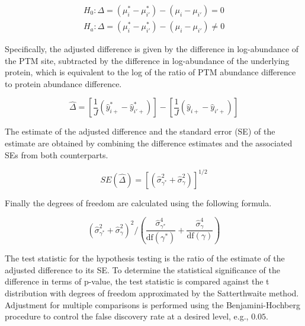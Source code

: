 \documentclass[mcp]{article}
\numberwithin{table}{section}
\begin{document}
\begin{equation}
\begin{aligned}
H_{0}: \Delta = ( \mu_{i}^{\ast} - \mu_{i'}^{\ast} ) - ( \mu_{i} - \mu_{i'} ) = 0 \\
H_{a}: \Delta = ( \mu_{i}^{\ast} - \mu_{i'}^{\ast} ) - ( \mu_{i} - \mu_{i'} ) \neq 0
\end{aligned}
\label{eq_1}
\end{equation}

Specifically, the adjusted difference is given by the difference in log-abundance of the PTM site, subtracted by the difference in log-abundance of the underlying protein, which is equivalent to the log of the ratio of PTM abundance difference to protein abundance difference. 

\begin{equation}
\hat{\Delta} = \left[ \frac{1}{J} \left( \hat{y}_{i+}^{\ast} - \hat{y}_{i'+}^{\ast} \right) \right] - \left[ \frac{1}{J} \left( \hat{y}_{i+} - \hat{y}_{i'+} \right) \right]
\end{equation}

The estimate of the adjusted difference and the standard error (SE) of the estimate are obtained by combining the difference estimates and the associated SEs from both counterparts.

\begin{equation}
SE(\hat{\Delta}) = \left[ \left( \hat{\sigma}_{\gamma^{\ast}}^{2} + \hat{\sigma}_{\gamma}^{2} \right) \right]^{1/2}
\end{equation}

Finally the degrees of freedom are calculated using the following formula.

\begin{equation}
\left( \hat{\sigma}_{\gamma^{\ast}}^{2} + \hat{\sigma}_{\gamma}^{2} \right)^2 \bigg/
\left( \frac{\hat{\sigma}_{\gamma^{\ast}}^{4}}{\mathrm{df}(\gamma^{\ast})} + \frac{\hat{\sigma}_{\gamma}^{4}}{ \mathrm{df}(\gamma)} \right)
\end{equation}

The test statistic for the hypothesis testing is the ratio of the estimate of the adjusted difference to its SE. To determine the statistical significance of the difference in terms of p-value, the test statistic is compared against the t distribution with degrees of freedom approximated by the Satterthwaite method\cite{satterthwaite:1946}. Adjustment for multiple comparisons is performed using the Benjamini-Hochberg procedure to control the false discovery rate at a desired level, e.g., $0.05$\cite{Benjamini:1995}.
\end{document}
